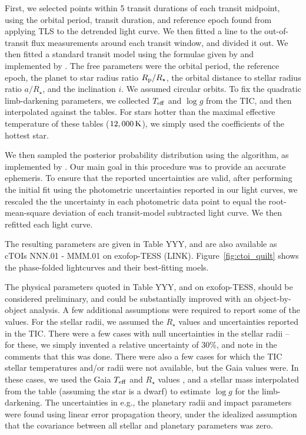 \documentclass[12pt,twocolumn,tighten]{aastex62}
\begin{document}
First, we selected points within 5 transit durations of each transit
midpoint, using the orbital period, transit duration, and reference
epoch found from applying TLS to the detrended light curve.  We then
fitted a line to the out-of-transit flux measurements around each
transit window, and divided it out.  We then fitted a standard transit
model using the formulae given by \citet{mandel_analytic_2002} and
implemented by \citet[][\texttt{BATMAN}]{kreidberg_batman_2015}.  The
free parameters were the orbital period, the reference epoch, the
planet to star radius ratio $R_{\rm p}/R_\star$, the orbital distance
to stellar radius ratio $a/R_\star$, and the inclination $i$.  We
assumed circular orbits.  To fix the quadratic limb-darkening
parameters, we collected $T_{\rm eff}$ and $\log g$ from the TIC, and
then interpolated against the \citet{claret_limb_2017} tables.  For
stars hotter than the maximal effective temperature of these tables
($12,000\,{\rm K}$), we simply used the coefficients of the hottest
star.

We then sampled the posterior probability distribution using the
\citet{goodman_ensemble_2010} algorithm, as implemented by
\citet[][\texttt{emcee}]{foreman-mackey_emcee_2013}.  Our main goal in
this procedure was to provide an accurate ephemeris.  To ensure that
the reported uncertainties are valid, after performing the initial fit
using the photometric uncertainties reported in our light curves, we
rescaled the the uncertainty in each photometric data point to equal
the root-mean-square deviation of each transit-model subtracted light
curve. We then refitted each light curve.

The resulting parameters are given in Table YYY, and are also
available as cTOIs NNN.01 - MMM.01 on exofop-TESS (LINK).
Figure~\ref{fig:ctoi_quilt} shows the phase-folded lightcurves and
their best-fitting moels.

The physical parameters quoted in Table YYY, and on exofop-TESS,
should be considered preliminary, and could be substantially improved
with an object-by-object analysis.  A few additional assumptions were
required to report some of the values.  For the stellar radii, we
assumed the $R_\star$ values and uncertainties reported in the TIC.
There were a few cases with null uncertainties in the stellar radii --
for these, we simply invented a relative uncertainty of 30\%, and note
in the comments that this was done.  There were also a few cases for
which the TIC stellar temperatures and/or radii were not available,
but the Gaia values were.  In these cases, we used the Gaia $T_{\rm
eff}$ and $R_\star$ values \citep{andrae_apsis_2018}, and a stellar
mass interpolated from the \citet{pecaut_intrinsic_2013} table
(assuming the star is a dwarf) to estimate $\log g$ for the
limb-darkening.  The uncertainties in e.g., the planetary radii and
impact parameters were found using linear error propagation theory,
under the idealized assumption that the covariance between all stellar
and planetary parameters was zero.
\end{document}
